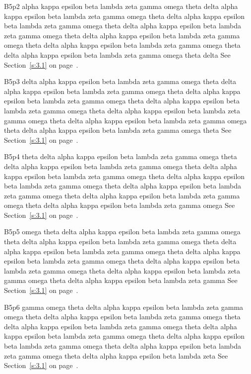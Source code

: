 B5p2 alpha kappa epsilon beta lambda zeta gamma omega theta delta alpha kappa epsilon beta lambda zeta gamma omega theta delta alpha kappa epsilon beta lambda zeta gamma omega theta delta alpha kappa epsilon beta lambda zeta gamma omega theta delta alpha kappa epsilon beta lambda zeta gamma omega theta delta alpha kappa epsilon beta lambda zeta gamma omega theta delta alpha kappa epsilon beta lambda zeta gamma omega theta delta See Section~\ref{s:3.1} on page~\pageref{s:3.1}.

B5p3 delta alpha kappa epsilon beta lambda zeta gamma omega theta delta alpha kappa epsilon beta lambda zeta gamma omega theta delta alpha kappa epsilon beta lambda zeta gamma omega theta delta alpha kappa epsilon beta lambda zeta gamma omega theta delta alpha kappa epsilon beta lambda zeta gamma omega theta delta alpha kappa epsilon beta lambda zeta gamma omega theta delta alpha kappa epsilon beta lambda zeta gamma omega theta See Section~\ref{s:3.1} on page~\pageref{s:3.1}.

B5p4 theta delta alpha kappa epsilon beta lambda zeta gamma omega theta delta alpha kappa epsilon beta lambda zeta gamma omega theta delta alpha kappa epsilon beta lambda zeta gamma omega theta delta alpha kappa epsilon beta lambda zeta gamma omega theta delta alpha kappa epsilon beta lambda zeta gamma omega theta delta alpha kappa epsilon beta lambda zeta gamma omega theta delta alpha kappa epsilon beta lambda zeta gamma omega See Section~\ref{s:3.1} on page~\pageref{s:3.1}.

B5p5 omega theta delta alpha kappa epsilon beta lambda zeta gamma omega theta delta alpha kappa epsilon beta lambda zeta gamma omega theta delta alpha kappa epsilon beta lambda zeta gamma omega theta delta alpha kappa epsilon beta lambda zeta gamma omega theta delta alpha kappa epsilon beta lambda zeta gamma omega theta delta alpha kappa epsilon beta lambda zeta gamma omega theta delta alpha kappa epsilon beta lambda zeta gamma See Section~\ref{s:3.1} on page~\pageref{s:3.1}.

B5p6 gamma omega theta delta alpha kappa epsilon beta lambda zeta gamma omega theta delta alpha kappa epsilon beta lambda zeta gamma omega theta delta alpha kappa epsilon beta lambda zeta gamma omega theta delta alpha kappa epsilon beta lambda zeta gamma omega theta delta alpha kappa epsilon beta lambda zeta gamma omega theta delta alpha kappa epsilon beta lambda zeta gamma omega theta delta alpha kappa epsilon beta lambda zeta See Section~\ref{s:3.1} on page~\pageref{s:3.1}.


